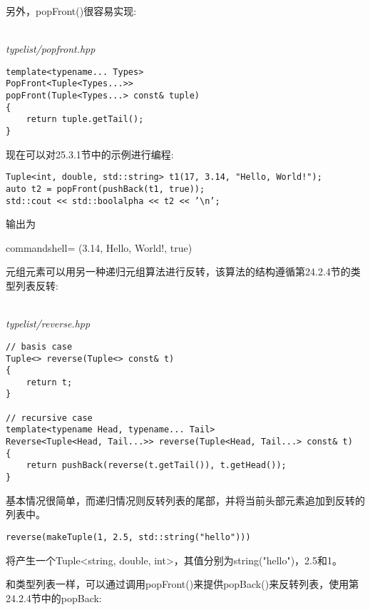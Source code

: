 另外，popFront()很容易实现:

\hspace*{\fill} \\ %
\noindent
\textit{typelist/popfront.hpp}
\begin{lstlisting}[style=styleCXX]
template<typename... Types>
PopFront<Tuple<Types...>>
popFront(Tuple<Types...> const& tuple)
{
	return tuple.getTail();
}
\end{lstlisting}

现在可以对25.3.1节中的示例进行编程:

\begin{lstlisting}[style=styleCXX]
Tuple<int, double, std::string> t1(17, 3.14, "Hello, World!");
auto t2 = popFront(pushBack(t1, true));
std::cout << std::boolalpha << t2 << ’\n’;
\end{lstlisting}

输出为

\begin{tcblisting}{commandshell={}}
(3.14, Hello, World!, true)
\end{tcblisting}


元组元素可以用另一种递归元组算法进行反转，该算法的结构遵循第24.2.4节的类型列表反转:

\hspace*{\fill} \\ %
\noindent
\textit{typelist/reverse.hpp}
\begin{lstlisting}[style=styleCXX]
// basis case
Tuple<> reverse(Tuple<> const& t)
{
	return t;
}

// recursive case
template<typename Head, typename... Tail>
Reverse<Tuple<Head, Tail...>> reverse(Tuple<Head, Tail...> const& t)
{
	return pushBack(reverse(t.getTail()), t.getHead());
}
\end{lstlisting}

基本情况很简单，而递归情况则反转列表的尾部，并将当前头部元素追加到反转的列表中。

\begin{lstlisting}[style=styleCXX]
reverse(makeTuple(1, 2.5, std::string("hello")))
\end{lstlisting}

将产生一个Tuple<string, double, int>，其值分别为string("hello")，2.5和1。

和类型列表一样，可以通过调用popFront()来提供popBack()来反转列表，使用第24.2.4节中的popBack:

